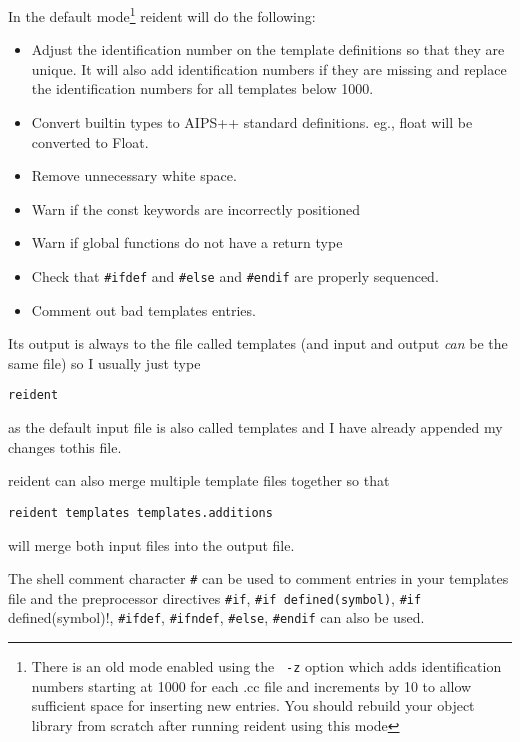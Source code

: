 In the default mode\footnote{There is an old mode enabled using the
  \texttt{ -z} option which adds identification numbers starting at
  1000 for each .cc file and increments by 10 to allow sufficient
  space for inserting new entries. You should rebuild your object
  library from scratch after running reident using this mode} reident
will do the following:
\begin{itemize}
\item Adjust the identification number on the template definitions so
  that they are unique. It will also add identification numbers if they
  are missing and replace the identification numbers for all templates
  below 1000.
\item Convert builtin types to AIPS++ standard definitions. eg., float
  will be converted to Float.
\item Remove unnecessary white space.
\item Warn if the const keywords are incorrectly positioned
\item Warn if global functions do not have a return type
\item Check that \verb!#ifdef! and \verb!#else! and \verb!#endif! are 
  properly sequenced.
\item Comment out bad templates entries.
\end{itemize}

Its output is always to the file called templates (and input and output
\emph{can} be the same file) so I usually just type
\begin{verbatim}
reident
\end{verbatim}
as the default input file is also called templates and I have already
appended my changes tothis file.

reident can also merge multiple template files together so that
\begin{verbatim}
reident templates templates.additions
\end{verbatim}
will merge both input files into the output file. 

The shell comment character \texttt{\#} can be used to comment entries in
your templates file and the preprocessor directives \verb!#if!,
\verb!#if defined(symbol)!, \verb!#if !defined(symbol)!, \verb!#ifdef!,
\verb!#ifndef!, \verb!#else!, \verb!#endif! can also be used. 

